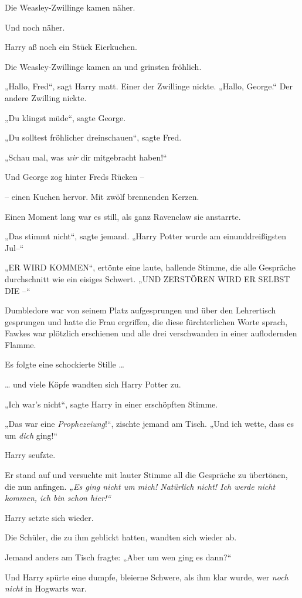 Die Weasley-Zwillinge kamen näher. 

Und noch näher. 

Harry aß noch ein Stück Eierkuchen. 

Die Weasley-Zwillinge kamen an und grinsten fröhlich. 

„Hallo, Fred“, sagt Harry matt. Einer der Zwillinge nickte. „Hallo, George.“ Der andere Zwilling nickte. 

„Du klingst müde“, sagte George. 

„Du solltest fröhlicher dreinschauen“, sagte Fred. 

„Schau mal, was \emph{wir} dir mitgebracht haben!“ 

Und George zog hinter Freds Rücken – 

– einen Kuchen hervor. Mit zwölf brennenden Kerzen. 

Einen Moment lang war es still, als ganz Ravenclaw sie anstarrte. 

„Das stimmt nicht“, sagte jemand. „Harry Potter wurde am einunddreißigsten Jul–“ 

„ER WIRD KOMMEN“, ertönte eine laute, hallende Stimme, die alle Gespräche durchschnitt wie ein eisiges Schwert. „UND ZERSTÖREN WIRD ER SELBST DIE –“ 

Dumbledore war von seinem Platz aufgesprungen und über den Lehrertisch gesprungen und hatte die Frau ergriffen, die diese fürchterlichen Worte sprach, Fawkes war plötzlich erschienen und alle drei verschwanden in einer auflodernden Flamme. 

Es folgte eine schockierte Stille … 

… und viele Köpfe wandten sich Harry Potter zu. 

„Ich war’s nicht“, sagte Harry in einer erschöpften Stimme. 

„Das war eine \emph{Prophezeiung}!“, zischte jemand am Tisch. „Und ich wette, dass es um \emph{dich} ging!“ 

Harry seufzte. 

Er stand auf und versuchte mit lauter Stimme all die Gespräche zu übertönen, die nun anfingen. \emph{„Es ging nicht um mich! Natürlich nicht! Ich werde nicht kommen, ich bin schon hier!“} 

Harry setzte sich wieder. 

Die Schüler, die zu ihm geblickt hatten, wandten sich wieder ab. 

Jemand anders am Tisch fragte: „Aber um wen ging es dann?“ 

Und Harry spürte eine dumpfe, bleierne Schwere, als ihm klar wurde, wer \emph{noch nicht} in Hogwarts war. 

